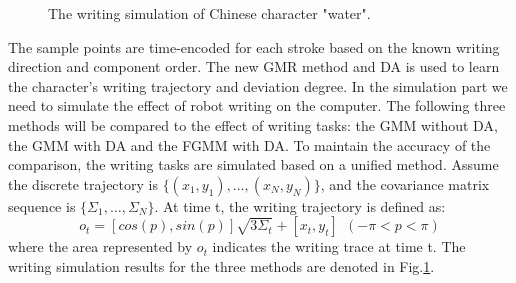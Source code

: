\documentclass[journal]{IEEEtran}
\begin{document}
\begin{figure}[!t]
{    }
    \caption{The writing simulation of Chinese character "water".}
    \label{fig5}
\end{figure}

The sample points are time-encoded for each stroke based on the known writing direction and component order. The new GMR method and DA is used to learn the character's writing trajectory and deviation degree. In the simulation part we need to simulate the effect of robot writing on the computer. The following three methods will be compared to the effect of writing tasks: the GMM without DA, the GMM with DA and the FGMM with DA. To maintain the accuracy of the comparison, the writing tasks are simulated based on a unified method. Assume the discrete trajectory is $\{(x_1,y_1),\hdots,(x_N,y_N)\}$, and the covariance matrix sequence is $\{\Sigma_1,\hdots,\Sigma_N\}$. At time t, the writing trajectory is defined as:
\begin{equation}
    o_t =[cos(p),sin(p)]\sqrt{3\Sigma_t}+[x_t,y_t]~~(-\pi<p<\pi)
\end{equation}
where the area represented by $o_t$ indicates the writing trace at time t. The writing simulation results for the three methods are denoted in Fig.\ref{fig5}. 
\end{document}
